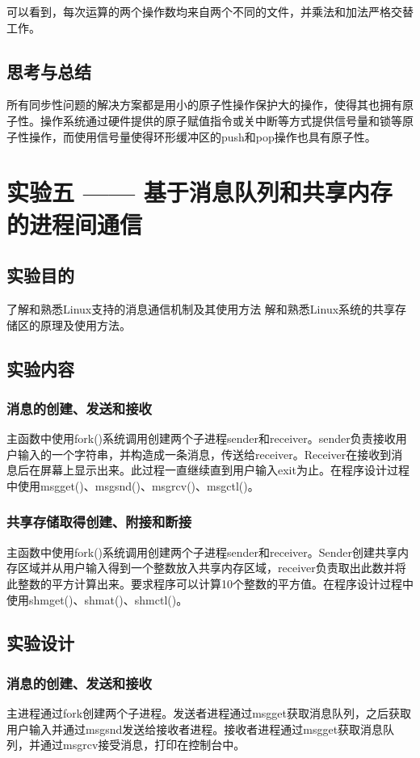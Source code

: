 \documentclass{ctexrep}
\begin{document}
可以看到，每次运算的两个操作数均来自两个不同的文件，并乘法和加法严格交替工作。

\section{思考与总结}

所有同步性问题的解决方案都是用小的原子性操作保护大的操作，使得其也拥有原子性。操作系统通过硬件提供的原子赋值指令或关中断等方式提供信号量和锁等原子性操作，而使用信号量使得环形缓冲区的push和pop操作也具有原子性。

\chapter{实验五 —— 基于消息队列和共享内存的进程间通信}
\section{实验目的}
\begin{outline}[cenumerate]
    \1 了解和熟悉Linux支持的消息通信机制及其使用方法
    \1 解和熟悉Linux系统的共享存储区的原理及使用方法。
\end{outline}
\section{实验内容}
\subsection{消息的创建、发送和接收}
主函数中使用fork()系统调用创建两个子进程sender和receiver。sender负责接收用户输入的一个字符串，并构造成一条消息，传送给receiver。Receiver在接收到消息后在屏幕上显示出来。此过程一直继续直到用户输入exit为止。在程序设计过程中使用msgget()、msgsnd()、msgrcv()、msgctl()。
\subsection{共享存储取得创建、附接和断接}
主函数中使用fork()系统调用创建两个子进程sender和receiver。Sender创建共享内存区域并从用户输入得到一个整数放入共享内存区域，receiver负责取出此数并将此整数的平方计算出来。要求程序可以计算10个整数的平方值。在程序设计过程中使用shmget()、shmat()、shmctl()。

\section{实验设计}
\subsection{消息的创建、发送和接收}
主进程通过fork创建两个子进程。发送者进程通过msgget获取消息队列，之后获取用户输入并通过msgsnd发送给接收者进程。接收者进程通过msgget获取消息队列，并通过msgrcv接受消息，打印在控制台中。
\end{document}
